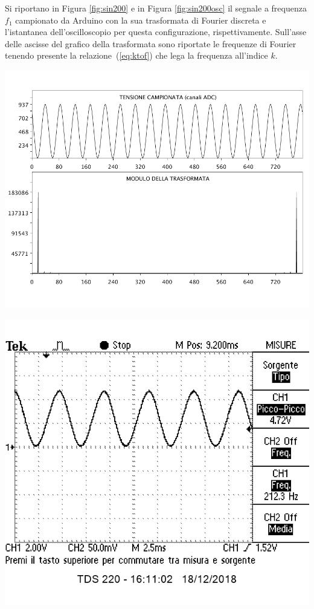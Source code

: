 \documentclass[10pt,oneside,a4paper]{article}
\newenvironment{Figure}
  {\par\medskip\noindent\minipage{\linewidth}}
  {\endminipage\par\medskip}
\begin{document}
\begin{multicols}{2}
Si riportano in Figura \ref{fig:sin200} e in Figura \ref{fig:sin200osc} il segnale a frequenza $f_1$ campionato da Arduino con la sua trasformata di Fourier discreta e l'istantanea dell'oscilloscopio per questa configurazione, rispettivamente. Sull'asse delle ascisse del grafico della trasformata sono riportate le frequenze di Fourier tenendo presente la relazione~(\ref{eq:ktof}) che lega la frequenza all'indice $k$.

\begin{Figure}
	\begin{center}
	\includegraphics[width=\linewidth]{sin200}
	\label{fig:sin200}
	\end{center}
\end{Figure}
\begin{Figure}
	\begin{center}
	\includegraphics[width=0.8\linewidth]{sin200osc}

\end{center}
\end{Figure}
\end{multicols}
\end{document}
